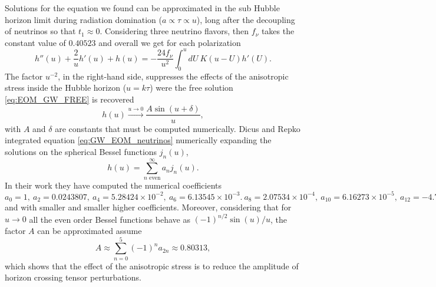 Solutions for the equation we found can be approximated in the sub Hubble horizon limit during radiation domination ($a\propto\tau\propto u$), long after the decoupling of neutrinos so that $t_1\approx 0$. Considering three neutrino flavors, then $f_\nu$ takes the constant value of $0.40523$ and overall we get for each polarization
$$ h''(u)+\frac{2}{u}h'(u)+h(u)=-\frac{24f_\nu}{u^2}\int_{0}^{u}dU\ K(u-U)h'(U).$$
The factor $u^{-2}$, in the right-hand side, suppresses the effects of the anisotropic stress inside the Hubble horizon ($u=k\tau$) were the free solution \eqref{eq:EOM_GW_FREE} is recovered
$$h(u)\xrightarrow{u\to 0} \frac{A\sin(u+\delta)}{u},$$
with $A$ and $\delta$ are constants that must be computed numerically. Dicus and Repko \cite{Dicus_Repko} integrated equation \eqref{eq:GW_EOM_neutrinos} numerically expanding the solutions on the spherical Bessel functions $j_n(u)$,
\begin{equation}
    \label{eq:Tmodes_nu_damped}
    h(u)=\sum_{n\text{ even}}^{\infty}a_n j_n(u).
\end{equation}
 In their work they have computed the numerical coefficients $a_0=1,\ a_2=0.0243807,\ a_4=5.28424\times10^{-2},\ a_6= 6.13545\times10^{-3}.\ a_8=2.07534\times10^{-4},\ a_{10}=6.16273\times10^{-5},\ a_{12}=-4.78885\times10^{-6}$ and with smaller and smaller higher coefficients. 
 Moreover, considering that for $u\to0$ all the even order Bessel functions behave as $(-1)^{n/2}\sin(u)/u$, the factor $A$ can be approximated assume
$$A\approx \sum_{n=0}^{5}(-1)^n a_{2n}\approx 0.80313,$$
which shows that the effect of the anisotropic stress is to reduce the amplitude of horizon crossing tensor perturbations.

